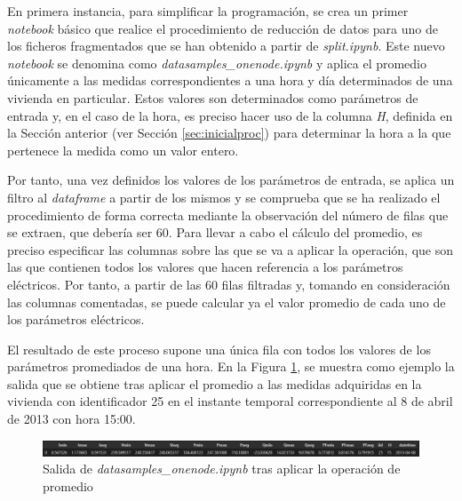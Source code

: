 En primera instancia, para simplificar la programación, se crea un primer \textit{notebook} básico que realice el procedimiento de reducción de datos para uno de los ficheros fragmentados que se han obtenido a partir de \textit{split.ipynb}. Este nuevo \textit{notebook} se denomina como \textit{datasamples\_onenode.ipynb} y aplica el promedio únicamente a las medidas correspondientes a una hora y día determinados de una vivienda en particular. Estos valores son determinados como parámetros de entrada y, en el caso de la hora, es preciso hacer uso de la columna \textit{H}, definida en la Sección anterior (ver Sección \ref{sec:inicialproc}) para determinar la hora a la que pertenece la medida como un valor entero.

\vspace{3mm}

Por tanto, una vez definidos los valores de los parámetros de entrada, se aplica un filtro al \textit{dataframe} a partir de los mismos y se comprueba que se ha realizado el procedimiento de forma correcta mediante la observación del número de filas que se extraen, que debería ser 60. Para llevar a cabo el cálculo del promedio, es preciso especificar las columnas sobre las que se va a aplicar la operación, que son las que contienen todos los valores que hacen referencia a los parámetros eléctricos. Por tanto, a partir de las 60 filas filtradas y, tomando en consideración las columnas comentadas, se puede calcular ya el valor promedio de cada uno de los parámetros eléctricos. 

\vspace{3mm}

El resultado de este proceso supone una única fila con todos los valores de los parámetros promediados de una hora. En la Figura \ref{fig:datasamples}, se muestra como ejemplo la salida que se obtiene tras aplicar el promedio a las medidas adquiridas en la vivienda con identificador 25 en el instante temporal correspondiente al 8 de abril de 2013 con hora 15:00.

\vspace{3mm}

\begin{figure}[h!]
  \centering
  \includegraphics[width=1\textwidth]{img/diseno/datasamples.png}
  \caption{Salida de \textit{datasamples\_onenode.ipynb} tras aplicar la operación de promedio}
  \label{fig:datasamples}
\end{figure}

